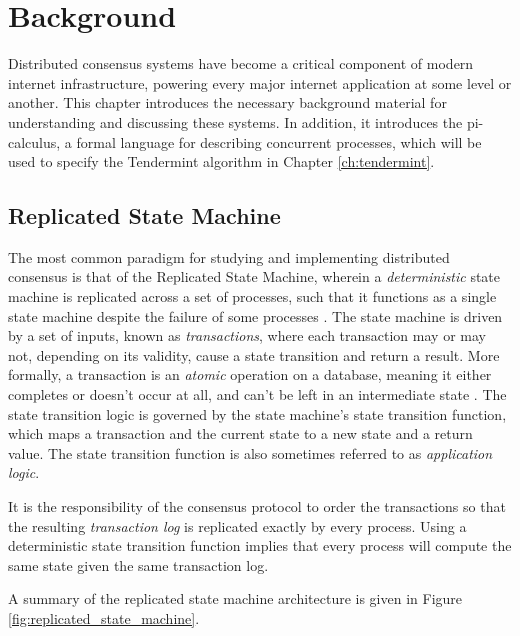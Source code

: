\chapter{Background}
\label{ch:background}

\renewcommand{\|}{\;|\;}

Distributed consensus systems have become a critical component of modern internet infrastructure, 
powering every major internet application at some level or another.
This chapter introduces the necessary background material for understanding and discussing these systems.
In addition, it introduces the pi-calculus, a formal language for describing concurrent processes,
which will be used to specify the Tendermint algorithm in Chapter \ref{ch:tendermint}.

\section{Replicated State Machine}

The most common paradigm for studying and implementing distributed consensus is that of the Replicated State Machine, 
wherein a \emph{deterministic} state machine is replicated across a set of processes, 
such that it functions as a single state machine 
despite the failure of some processes \cite{schneider1990implementing}.
The state machine is driven by a set of inputs, known as \emph{transactions}, 
where each transaction may or may not, depending on its validity, cause a state transition and return a result.
More formally, a transaction is an \emph{atomic} operation on a database, 
meaning it either completes or doesn't occur at all, 
and can't be left in an intermediate state \cite{gray1981transaction}.
The state transition logic is governed by the state machine's state transition function,
which maps a transaction and the current state to a new state and a return value.
The state transition function is also sometimes referred to as \emph{application logic}.

It is the responsibility of the consensus protocol to order the transactions so that the resulting 
\emph{transaction log} is replicated exactly by every process.
Using a deterministic state transition function implies that 
every process will compute the same state given the same transaction log.

A summary of the replicated state machine architecture is given in Figure \ref{fig:replicated_state_machine}.

